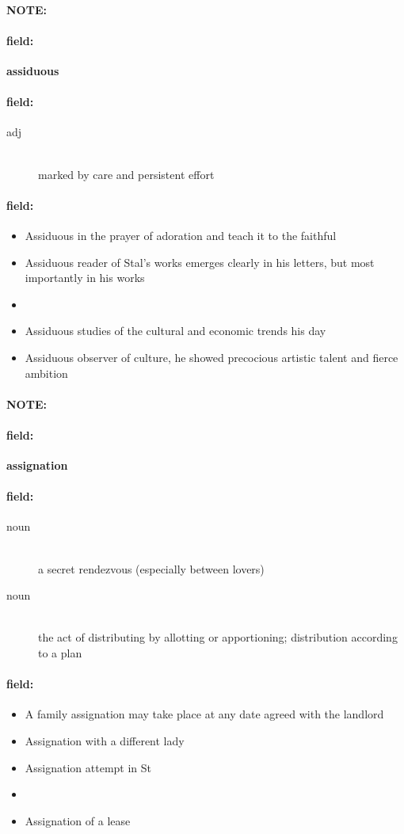 \documentclass[12pt]{article}
\newenvironment{note}{\paragraph{NOTE:}}{}
\newenvironment{field}{\paragraph{field:}}{}
\begin{document}
\begin{note}
\begin{field}
\textbf{\large assiduous}
\end{field}


\begin{field}
\begin{description}
\item[adj] \hfill \\ 
marked by care and persistent effort

\end{description}
\end{field}

\begin{field}
\begin{itemize}
\item Assiduous in the prayer of adoration and teach it to the faithful
\item Assiduous reader of Stal's works emerges clearly in his letters, but most importantly in his works
\item 
\item Assiduous studies of the cultural and economic trends his day
\item Assiduous observer of culture, he showed precocious artistic talent and fierce ambition
\end{itemize}
\end{field}
\end{note}
\begin{note}
\begin{field}
\textbf{\large assignation}
\end{field}


\begin{field}
\begin{description}
\item[noun] \hfill \\ 
a secret rendezvous (especially between lovers)

\item[noun] \hfill \\ 
the act of distributing by allotting or apportioning; distribution according to a plan

\end{description}
\end{field}

\begin{field}
\begin{itemize}
\item A family assignation may take place at any date agreed with the landlord
\item Assignation with a different lady
\item Assignation attempt in St
\item 
\item Assignation of a lease
\end{itemize}
\end{field}
\end{note}
\end{document}
